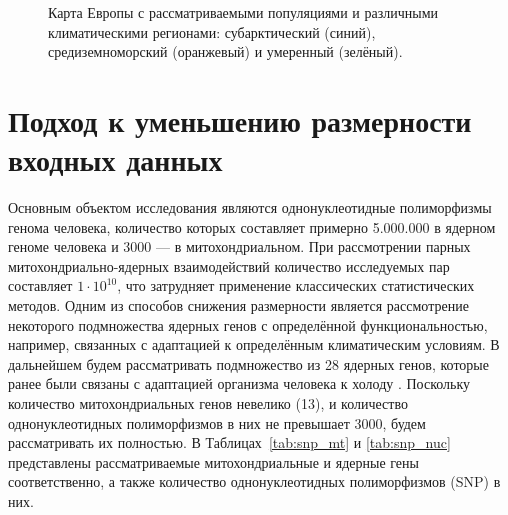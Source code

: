 \begin{figure}[ht]
	\caption{Карта Европы с рассматриваемыми популяциями и различными климатическими регионами: субарктический (синий), средиземноморский (оранжевый) и умеренный (зелёный).}\label{fig:europe_map}
\end{figure}

\section{Подход к уменьшению размерности входных данных}\label{sec:ch3/sec2}

Основным объектом исследования являются однонуклеотидные полиморфизмы генома человека, количество которых составляет примерно 5.000.000 в ядерном геноме человека и 3000 --- в митохондриальном. При рассмотрении парных митохондриально-ядерных взаимодействий количество исследуемых пар составляет $1 \cdot 10^{10}$, что затрудняет применение классических статистических методов. Одним из способов снижения размерности является рассмотрение некоторого подмножества ядерных генов с определённой функциональностью, например, связанных с адаптацией к определённым климатическим условиям. В дальнейшем будем рассматривать подмножество из 28 ядерных генов, которые ранее были связаны с адаптацией организма человека к холоду \autocite{Sazzini2014}. Поскольку количество митохондриальных генов невелико (13), и количество однонуклеотидных полиморфизмов в них не превышает 3000, будем рассматривать их полностью. В Таблицах~\ref{tab:snp_mt} и \ref{tab:snp_nuc} представлены рассматриваемые митохондриальные и ядерные гены соответственно, а также количество однонуклеотидных полиморфизмов (SNP) в них.

